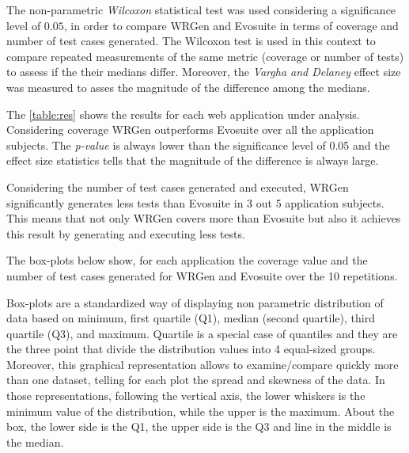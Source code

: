 The non-parametric \textit{Wilcoxon} statistical test was used considering a significance level of $0.05$, in order to compare WRGen and Evosuite in terms of coverage and number of test cases generated. The Wilcoxon test is used in this context to compare repeated measurements of the same metric (coverage or number of tests) to assess if the their medians differ. Moreover, the \emph{Vargha and Delaney} effect size was measured to asses the magnitude of the difference among the medians.

The \autoref{table:res} shows the results for each web application under analysis. Considering coverage WRGen outperforms Evosuite over all the application subjects. The \textit{p-value} is always lower than the significance level of 0.05 and the effect size statistics tells that the magnitude of the difference is always large.

Considering the number of test cases generated and executed, WRGen significantly generates less tests than Evosuite in 3 out 5 application subjects. This means that not only WRGen covers more than Evosuite but also it achieves this result by generating and executing less tests.


The box-plots below show, for each application the coverage value and the number of test cases generated for WRGen and Evosuite over the 10 repetitions. 

Box-plots are a standardized way of displaying non parametric distribution of data based on minimum, first quartile (Q1), median (second quartile), third quartile (Q3), and maximum. Quartile is a special case of quantiles and they are the three point that divide the distribution values into 4 equal-sized groups. Moreover, this graphical representation allows to examine/compare quickly more than one dataset, telling for each plot the spread and skewness of the data. In those representations, following the vertical axis, the lower whiskers is the minimum value of the distribution, while the upper is the maximum. About the box, the lower side is the Q1, the upper side is the Q3 and line in the middle is the median.

